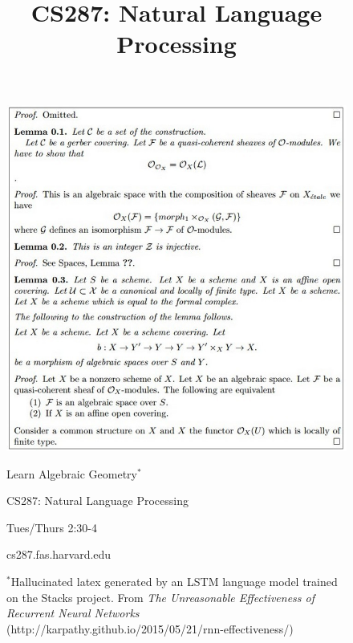 \documentclass{article}
\title{CS287: Natural Language Processing}
\date{}
\begin{document}
\begin{figure}[c!]
  \centering
  \includegraphics[width=1\linewidth]{latex3}

\vspace{1cm}
\begin{center}
\begin{center}
  {\huge Learn Algebraic Geometry$^*$}
\end{center}
\vspace{1cm}

 {\LARGE CS287: Natural Language Processing}
 \vspace{0.25cm}

 {\LARGE Tues/Thurs 2:30-4}
 \vspace{0.25cm}

 {\LARGE cs287.fas.harvard.edu}

\vspace{3cm}
{\footnotesize $^*$Hallucinated latex generated by an LSTM language model trained on the Stacks project. From \textit{The Unreasonable Effectiveness of Recurrent Neural Networks}  (http://karpathy.github.io/2015/05/21/rnn-effectiveness/)}

\end{center}

\end{figure}
\end{document}
